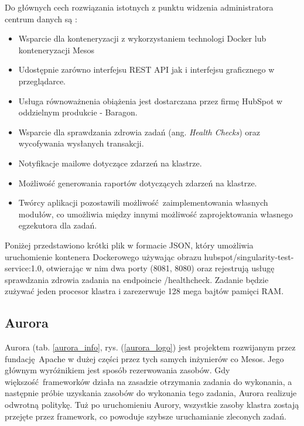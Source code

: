 \documentclass[10pt,a4paper,titlepage,twoside]{report}
\begin{document}
Do głównych cech rozwiązania istotnych z punktu widzenia administratora centrum danych są \cite{ad42}:
\begin{itemize}
\item Wsparcie dla konteneryzacji z wykorzystaniem technologi Docker lub konteneryzacji Mesos
\item Udostępnie zarówno interfejsu REST API jak i interfejsu graficznego w przeglądarce. 
\item Usługa równoważnenia obiążenia jest dostarczana przez firmę HubSpot w oddzielnym produkcie - Baragon.
\item Wsparcie dla sprawdzania zdrowia zadań (ang. \textit{Health Checks}) oraz wycofywania wysłanych transakcji.
\item Notyfikacje mailowe dotyczące zdarzeń na klastrze.
\item Możliwość generowania raportów dotyczących zdarzeń na klastrze.
\item Twórcy aplikacji pozostawili możliwość zaimplementowania własnych modułów, co umożliwia między innymi możliwość zaprojektowania własnego egzekutora dla zadań. 
\end{itemize}

Poniżej przedstawiono krótki plik w formacie JSON, który umożliwia uruchomienie kontenera Dockerowego używając obrazu hubspot/singularity-test-service:1.0, otwierając w nim dwa porty (8081, 8080) oraz rejestrują usługę sprawdzania zdrowia zadania na endpoincie /healthcheck. Zadanie będzie zużywać jeden procesor klastra i zarezerwuje 128 mega bajtów pamięci RAM.



\subsection{Aurora}
Aurora (tab. \ref{aurora_info}, rys. (\ref{aurora_logo}) jest projektem rozwijanym przez fundację Apache w dużej części przez tych samych inżynierów co Mesos. Jego głównym wyróżnikiem jest sposób rezerwowania zasobów. Gdy większość frameworków działa na zasadzie otrzymania zadania do wykonania, a następnie próbie uzyskania zasobów do wykonania tego zadania, Aurora realizuje odwrotną politykę. Tuż po uruchomieniu Aurory, wszystkie zasoby klastra zostają przejęte przez framework, co powoduje szybsze uruchamianie zleconych zadań.
\end{document}
